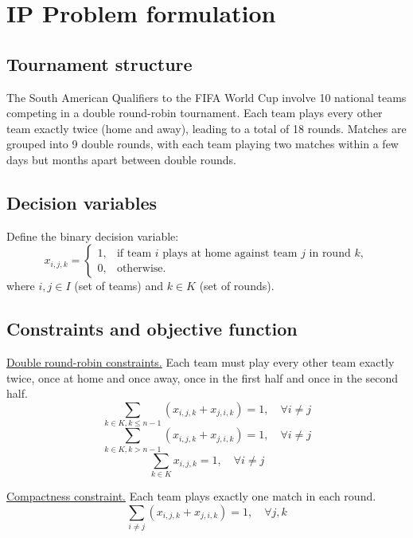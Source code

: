 \documentclass{article}
\begin{document}
\section{IP Problem formulation}

\subsection{Tournament structure}
The South American Qualifiers to the FIFA World Cup involve 10 national teams competing in a double round-robin tournament. Each team plays every other team exactly twice (home and away), leading to a total of 18 rounds. Matches are grouped into 9 double rounds, with each team playing two matches within a few days but months apart between double rounds.

\subsection{Decision variables}
Define the binary decision variable:
\begin{equation}
    x_{i,j,k} =
    \begin{cases}
        1, & \text{if team } i \text{ plays at home against team } j \text{ in round } k, \\
        0, & \text{otherwise.}
    \end{cases}
\end{equation}
where $i, j \in I$ (set of teams) and $k \in K$ (set of rounds).

\subsection{Constraints and objective function}
\medskip
\noindent
\underline{Double round-robin constraints.}
Each team must play every other team exactly twice, once at home and once away, once in the first half and once in the second half.
\begin{equation}
    \sum_{k \in K, k \leq n-1} (x_{i,j,k} + x_{j,i,k}) = 1, \quad \forall i \neq j
\end{equation}
\begin{equation}
    \sum_{k \in K, k > n-1} (x_{i,j,k} + x_{j,i,k}) = 1, \quad \forall i \neq j
\end{equation}
\begin{equation}
    \sum_{k \in K} x_{i,j,k} = 1, \quad \forall i \neq j
\end{equation}

\medskip
\noindent
\underline{Compactness constraint.}
Each team plays exactly one match in each round.
\begin{equation}
    \sum_{i \neq j} (x_{i,j,k} + x_{j,i,k}) = 1, \quad \forall j, k
\end{equation}
\end{document}
